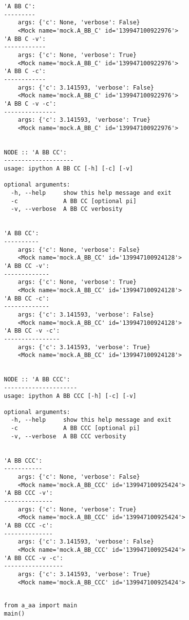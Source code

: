 \documentclass[10pt]{amsart}
\numberwithin{equation}{section}
\begin{document}
\begin{verbatim}
'A BB C':
---------
	args: {'c': None, 'verbose': False}
	<Mock name='mock.A_BB_C' id='139947100922976'>
'A BB C -v':
------------
	args: {'c': None, 'verbose': True}
	<Mock name='mock.A_BB_C' id='139947100922976'>
'A BB C -c':
------------
	args: {'c': 3.141593, 'verbose': False}
	<Mock name='mock.A_BB_C' id='139947100922976'>
'A BB C -v -c':
---------------
	args: {'c': 3.141593, 'verbose': True}
	<Mock name='mock.A_BB_C' id='139947100922976'>


NODE :: 'A BB CC':
--------------------
usage: ipython A BB CC [-h] [-c] [-v]

optional arguments:
  -h, --help     show this help message and exit
  -c             A BB CC [optional pi]
  -v, --verbose  A BB CC verbosity


'A BB CC':
----------
	args: {'c': None, 'verbose': False}
	<Mock name='mock.A_BB_CC' id='139947100924128'>
'A BB CC -v':
-------------
	args: {'c': None, 'verbose': True}
	<Mock name='mock.A_BB_CC' id='139947100924128'>
'A BB CC -c':
-------------
	args: {'c': 3.141593, 'verbose': False}
	<Mock name='mock.A_BB_CC' id='139947100924128'>
'A BB CC -v -c':
----------------
	args: {'c': 3.141593, 'verbose': True}
	<Mock name='mock.A_BB_CC' id='139947100924128'>


NODE :: 'A BB CCC':
---------------------
usage: ipython A BB CCC [-h] [-c] [-v]

optional arguments:
  -h, --help     show this help message and exit
  -c             A BB CCC [optional pi]
  -v, --verbose  A BB CCC verbosity


'A BB CCC':
-----------
	args: {'c': None, 'verbose': False}
	<Mock name='mock.A_BB_CCC' id='139947100925424'>
'A BB CCC -v':
--------------
	args: {'c': None, 'verbose': True}
	<Mock name='mock.A_BB_CCC' id='139947100925424'>
'A BB CCC -c':
--------------
	args: {'c': 3.141593, 'verbose': False}
	<Mock name='mock.A_BB_CCC' id='139947100925424'>
'A BB CCC -v -c':
-----------------
	args: {'c': 3.141593, 'verbose': True}
	<Mock name='mock.A_BB_CCC' id='139947100925424'>


\end{verbatim}

\begin{verbatim}
from a_aa import main
main()
\end{verbatim}
\end{document}
